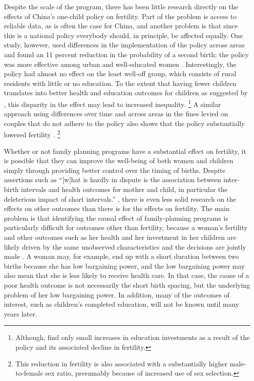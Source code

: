 \documentclass[letterpaper,12pt]{article}
\begin{document}
Despite the scale of the program, there has been little research
directly on the effects of China's one-child policy on fertility. 
Part of the problem is access to reliable data, as is often the case for
China, and another problem is that since this is a national policy
everybody should, in principle, be affected equally. 
One study, however, used differences in the implementation of the policy
across areas and found an 11 percent reduction in the probability of a
second birth; the policy was more effective among urban and
well-educated women \citep{Li2005}.
Interestingly, the policy had almost no eﬀect on the least well-oﬀ
group, which consists of rural residents with little or no education. 
To the extent that having fewer children translates into better health
and education outcomes for children as suggested by \citet{becker73},
this disparity in the effect may lead to increased inequality.%
\footnote{
Although, \citet{Rosenzweig2009} find only small increases in education
investments as a result of the policy and its associated decline in
fertility.}
A similar approach using differences over time and across areas in the 
fines levied on couples that do not adhere to the policy also shows
that the policy substantially lowered fertility \citep{Ebenstein2010}.%
\footnote{
This reduction in fertility is also associated with a substantially
higher male-to-female sex ratio, presumably because of increased use
of sex selection. 
}

Whether or not family planning programs have a substantial effect on
fertility, it is possible that they can improve the well-being of both
women and children simply through providing better control over the
timing of births. 
Despite assertions such as ``{[}w{]}hat is hardly in dispute is the
association between inter-birth intervals and health outcomes for mother
and child, in particular the deleterious impact of short intervals.''
\citep[p. 
175]{Casterline2016}, there is even less solid research on the effects
on other outcomes than there is for the effects on fertility. 
The main problem is that identifying the causal effect of
family-planning programs is particularly difficult for outcomes other
than fertility, because a woman's fertility and other outcomes such as
her health and her investment in her children are likely driven by the
same unobserved characteristics and the decisions are jointly made
\citep{Schultz2005}. 
A woman may, for example, end up with a short duration between two
births because she has low bargaining power, and the low bargaining
power may also mean that she is less likely to receive health care. 
In that case, the cause of a poor health outcome is not necessarily the
short birth spacing, but the underlying problem of her low bargaining
power. 
In addition, many of the outcomes of interest, such as children's
completed education, will not be known until many years later.
\end{document}
